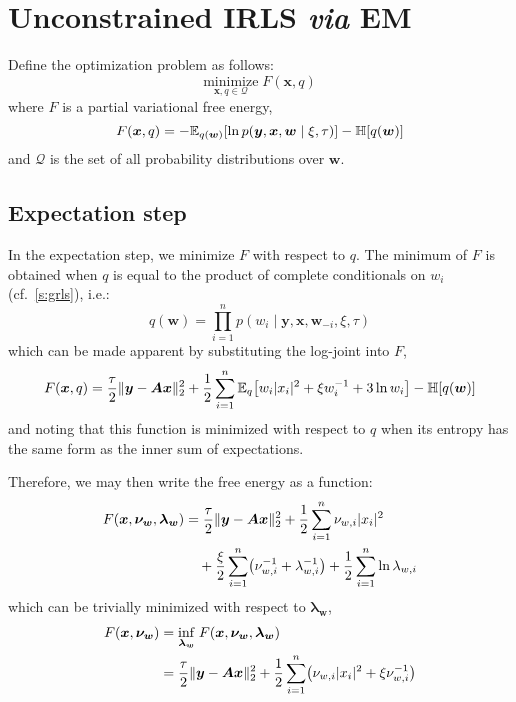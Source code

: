 \documentclass{article}
\numberwithin{equation}{section}
\newcommand{\lh}{\mathopen{}\mathclose\bgroup\left}
\newcommand{\rh}{\aftergroup\egroup\right}
\newcommand{\entropy}[1]{\mathbb{H}\lh[ #1 \rh]}
\newcommand{\E}[2]{\mathbb{E}_{#2}\lh[ #1 \rh]}
\newcommand{\m}[1]{\boldsymbol{#1}}
\newcommand{\setQ}{\mathcal{Q}}
\begin{document}
\clearpage
\section{Unconstrained IRLS \emph{via} EM}
\label{s:irls_em}
Define the optimization problem as follows:
\begin{equation}
\underset{\m{x}, q \in \setQ}{\text{minimize}} \; F(\m{x}, q)
\end{equation}
where $F$ is a partial variational free energy,
\begin{equation}
F(\m{x}, q) =
 -\E{\ln p(\m{y}, \m{x}, \m{w} \mid \xi, \tau)}{q(\m{w})}
 -\entropy{q(\m{w})}
\end{equation}
and $\setQ$ is the set of all probability distributions over $\m{w}$.

\subsection{Expectation step}
In the expectation step, we minimize $F$ with respect to $q$. The minimum
of $F$ is obtained when $q$ is equal to the product of complete conditionals
on $w_i$ (cf.~\ref{s:grls}), i.e.:
\begin{equation}
q(\m{w}) = \prod_{i=1}^n p(w_i \mid \m{y}, \m{x}, \m{w}_{-i}, \xi, \tau)
\end{equation}
which can be made apparent by substituting the log-joint into $F$,
\begin{equation}
F(\m{x}, q) =
  \frac{\tau}{2} \| \m{y} - \m{A} \m{x} \|_2^2
 +\frac{1}{2} \sum_{i=1}^n \E{w_i |x_i|^2 + \xi w_i^{-1} + 3 \ln w_i}{q}
 -\entropy{q(\m{w})}
\end{equation}
and noting that this function is minimized with respect to $q$ when its
entropy has the same form as the inner sum of expectations.

Therefore, we may then write the free energy as a function:
\begin{equation}
\begin{aligned}
F(\m{x}, \m{\nu_w}, \m{\lambda_w}) &=
   \frac{\tau}{2} \| \m{y} - \m{A} \m{x} \|_2^2
 + \frac{1}{2} \sum_{i=1}^n \nu_{w,i} |x_i|^2
\\ &\quad
 + \frac{\xi}{2} \sum_{i=1}^n \lh( \nu_{w,i}^{-1} + \lambda_{w,i}^{-1} \rh)
 + \frac{1}{2} \sum_{i=1}^n \ln \lambda_{w,i}
\end{aligned}
\end{equation}
which can be trivially minimized with respect to $\m{\lambda_w}$,
\begin{equation}
\begin{aligned}
F(\m{x}, \m{\nu_w}) &=
 \underset{\m{\lambda_w}}{\inf} \; F(\m{x}, \m{\nu_w}, \m{\lambda_w})
\\ &=
 \frac{\tau}{2} \| \m{y} - \m{A} \m{x} \|_2^2
 +\frac{1}{2} \sum_{i=1}^n \lh(
   \nu_{w,i} |x_i|^2 + \xi \nu_{w,i}^{-1}
  \rh)
\end{aligned}
\end{equation}
\end{document}
